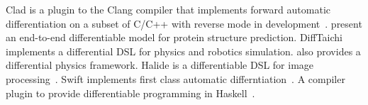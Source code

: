 Clad is a plugin to the Clang compiler that implements forward automatic differentiation on a subset of C/C++ with reverse mode in development~\cite{Vassilev_Clad}. \citet{chen2018neural} present an end-to-end differentiable model for protein structure prediction. 
DiffTaichi~\cite{hu2019difftaichi} implements a differential DSL for physics and robotics simulation. \citet{NIPS2018_7948} also provides a differential physics framework. Halide is a differentiable DSL for image processing~\cite{Li:2018:DPI}. Swift implements first class automatic differntiation~\cite{SwiftAutodiff}. A compiler plugin to provide differentiable programming in Haskell~\cite{Elliott2018-gr}.

